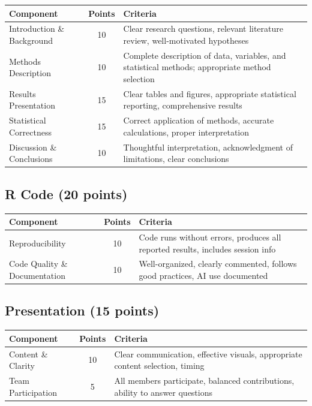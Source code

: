 \documentclass[11pt]{article}
\begin{document}
\begin{table}[h]
\centering
\begin{tabular}{p{5cm}cp{7cm}}
\toprule
\textbf{Component} & \textbf{Points} & \textbf{Criteria} \\
\midrule
Introduction \& Background & 10 & Clear research questions, relevant literature review, well-motivated hypotheses \\
\midrule
Methods Description & 10 & Complete description of data, variables, and statistical methods; appropriate method selection \\
\midrule
Results Presentation & 15 & Clear tables and figures, appropriate statistical reporting, comprehensive results \\
\midrule
Statistical Correctness & 15 & Correct application of methods, accurate calculations, proper interpretation \\
\midrule
Discussion \& Conclusions & 10 & Thoughtful interpretation, acknowledgment of limitations, clear conclusions \\
\bottomrule
\end{tabular}
\end{table}

\subsection{R Code (20 points)}

\begin{table}[h]
\centering
\begin{tabular}{p{5cm}cp{7cm}}
\toprule
\textbf{Component} & \textbf{Points} & \textbf{Criteria} \\
\midrule
Reproducibility & 10 & Code runs without errors, produces all reported results, includes session info \\
\midrule
Code Quality \& Documentation & 10 & Well-organized, clearly commented, follows good practices, AI use documented \\
\bottomrule
\end{tabular}
\end{table}

\subsection{Presentation (15 points)}

\begin{table}[h]
\centering
\begin{tabular}{p{5cm}cp{7cm}}
\toprule
\textbf{Component} & \textbf{Points} & \textbf{Criteria} \\
\midrule
Content \& Clarity & 10 & Clear communication, effective visuals, appropriate content selection, timing \\
\midrule
Team Participation & 5 & All members participate, balanced contributions, ability to answer questions \\
\bottomrule
\end{tabular}
\end{table}
\end{document}
